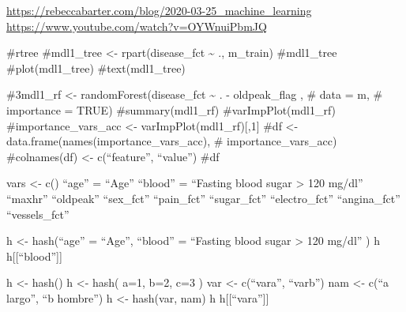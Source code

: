 \documentclass[
]{article}
\begin{document}
\url{https://rebeccabarter.com/blog/2020-03-25_machine_learning}
\url{https://www.youtube.com/watch?v=OYWnuiPbmJQ}

\#rtree \#mdl1\_tree \textless- rpart(disease\_fct \textasciitilde{} .,
m\_train) \#mdl1\_tree \#plot(mdl1\_tree) \#text(mdl1\_tree)

\#3mdl1\_rf \textless- randomForest(disease\_fct \textasciitilde{} . -
oldpeak\_flag , \# data = m, \# importance = TRUE) \#summary(mdl1\_rf)
\#varImpPlot(mdl1\_rf) \#importance\_vars\_acc \textless-
varImpPlot(mdl1\_rf){[},1{]} \#df \textless-
data.frame(names(importance\_vars\_acc), \# importance\_vars\_acc)
\#colnames(df) \textless- c(``feature'', ``value'') \#df

vars \textless- c() ``age'' = ``Age'' ``blood'' = ``Fasting blood sugar
\textgreater{} 120 mg/dl'' ``maxhr'' ``oldpeak'' ``sex\_fct''
``pain\_fct'' ``sugar\_fct'' ``electro\_fct'' ``angina\_fct''
``vessels\_fct''

h \textless- hash(``age'' = ``Age'', ``blood'' = ``Fasting blood sugar
\textgreater{} 120 mg/dl'' ) h h{[}{[}``blood''{]}{]}

h \textless- hash() h \textless- hash( a=1, b=2, c=3 ) var \textless-
c(``vara'', ``varb'') nam \textless- c(``a largo'', ``b hombre'') h
\textless- hash(var, nam) h h{[}{[}``vara''{]}{]}
\end{document}
